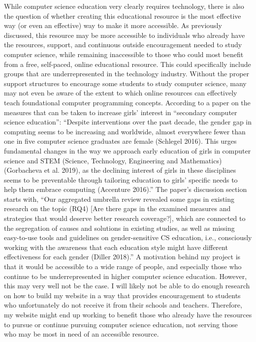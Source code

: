 \documentclass[10pt,twocolumn]{article}
\begin{document}
While computer science education very clearly requires technology, there is also the question of whether creating this educational resource is the most effective way (or even an effective) way to make it more accessible. As previously discussed, this resource may be more accessible to individuals who already have the resources, support, and continuous outside encouragement needed to study computer science, while remaining inaccessible to those who could most benefit from a free, self-paced, online educational resource. This could specifically include groups that are underrepresented in the technology industry. Without the proper support structures to encourage some students to study computer science, many may not even be aware of the extent to which online resources can effectively teach foundational computer programming concepts. According to a paper on the measures that can be taken to increase girls’ interest in “secondary computer science education”: “Despite interventions over the past decade, the gender gap in computing seems to be increasing and worldwide, almost everywhere fewer than one in five computer science graduates are female (Schlegel 2016). This urges fundamental changes in the way we approach early education of girls in computer science and STEM (Science, Technology, Engineering and Mathematics) (Gorbacheva et al. 2019), as the declining interest of girls in these disciplines seems to be preventable through tailoring education to girls’ specific needs to help them embrace computing (Accenture 2016).” The paper’s discussion section starts with, “Our aggregated umbrella review revealed some gaps in existing research on the topic (RQ4) [Are there gaps in the examined measures and strategies that would deserve better research coverage?], which are connected to the segregation of causes and solutions in existing studies, as well as missing easy-to-use tools and guidelines on gender-sensitive CS education, i.e., consciously working with the awareness that each education style might have different effectiveness for each gender (Diller 2018).”\cite{GirlsinTech} A motivation behind my project is that it would be accessible to a wide range of people, and especially those who continue to be underrepresented in higher computer science education. However, this may very well not be the case. I will likely not be able to do enough research on how to build my website in a way that provides encouragement to students who unfortunately do not receive it from their schools and teachers. Therefore, my website might end up working to benefit those who already have the resources to pursue or continue pursuing computer science education, not serving those who may be most in need of an accessible resource.
\end{document}
